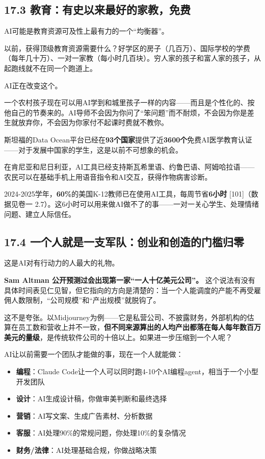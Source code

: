 \documentclass[11pt,a4paper]{ctexart}
\begin{document}
\subsection{17.3 教育：有史以来最好的家教，免费}

AI可能是教育资源可及性上最有力的一个“均衡器”。

以前，获得顶级教育资源需要什么？好学区的房子（几百万）、国际学校的学费（每年几十万）、一对一家教（每小时几百块）。穷人家的孩子和富人家的孩子，从起跑线就不在同一个跑道上。

AI正在改变这个。

一个农村孩子现在可以用AI学到和城里孩子一样的内容——而且是个性化的、按他自己的节奏来的。AI导师不会因为你问了“笨问题”而不耐烦，不会因为你是差生就放弃你，不会因为你家付不起课时费就不教你。

斯坦福的Data Ocean平台已经在\textbf{93个国家}提供了近\textbf{3600个}免费AI医学教育认证——对于发展中国家的学生，这是以前不可想象的机会。

在肯尼亚和尼日利亚，AI工具已经支持斯瓦希里语、约鲁巴语、阿姆哈拉语——农民可以在基础手机上用语音指令和AI交互，获得作物病害诊断。

2024-2025学年，\textbf{60\%}的美国K-12教师已在使用AI工具，每周节省\textbf{6小时}{} [101]（数据见卷一 2.7）。这6小时可以用来做AI做不了的事——一对一关心学生、处理情绪问题、建立人际信任。

\subsection{17.4 一个人就是一支军队：创业和创造的门槛归零}

这是AI对有行动力的人最大的礼物。

\textbf{Sam Altman 公开预测过会出现第一家“一人十亿美元公司”。} 这个说法有没有具体时间表见仁见智，但它指向的方向是清楚的：当一个人能调度的产能不再受雇佣人数限制，“公司规模”和“产出规模”就脱钩了。

这不是夸张。以Midjourney为例——它是私营公司、不披露财务，外部机构的估算在员工数和营收上并不一致，\textbf{但不同来源算出的人均产出都落在每人每年数百万美元的量级}，是传统软件公司的十倍以上。如果进一步压缩到一个人呢？

AI让以前需要一个团队才能做的事，现在一个人就能做：

\begin{itemize}
  \item \textbf{编程}：Claude Code让一个人可以同时跑4-10个AI编程agent，相当于一个小型开发团队
  \item \textbf{设计}：AI生成设计稿，你做审美判断和最终选择
  \item \textbf{营销}：AI写文案、生成广告素材、分析数据
  \item \textbf{客服}：AI处理90\%的常规问题，你处理10\%的复杂情况
  \item \textbf{财务/法律}：AI处理基础合规，你做战略决策
\end{itemize}
\end{document}
